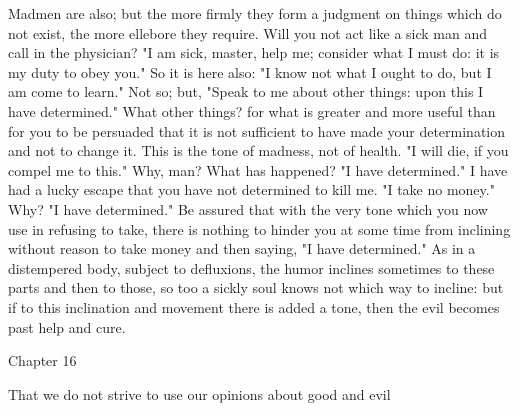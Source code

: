 \documentclass[a4paper]{article}
\begin{document}
Madmen are also; but the more firmly they form a judgment on things which do
not exist, the more ellebore they require. Will you not act like a sick man and
call in the physician? "I am sick, master, help me; consider what I must do: it
is my duty to obey you." So it is here also: "I know not what I ought to do,
but I am come to learn." Not so; but, "Speak to me about other things: upon
this I have determined." What other things? for what is greater and more useful
than for you to be persuaded that it is not sufficient to have made your
determination and not to change it. This is the tone of madness, not of health.
"I will die, if you compel me to this." Why, man? What has happened? "I have
determined." I have had a lucky escape that you have not determined to kill me.
"I take no money." Why? "I have determined." Be assured that with the very tone
which you now use in refusing to take, there is nothing to hinder you at some
time from inclining without reason to take money and then saying, "I have
determined." As in a distempered body, subject to defluxions, the humor
inclines sometimes to these parts and then to those, so too a sickly soul knows
not which way to incline: but if to this inclination and movement there is
added a tone, then the evil becomes past help and cure.

Chapter 16

That we do not strive to use our opinions about good and evil
\end{document}
